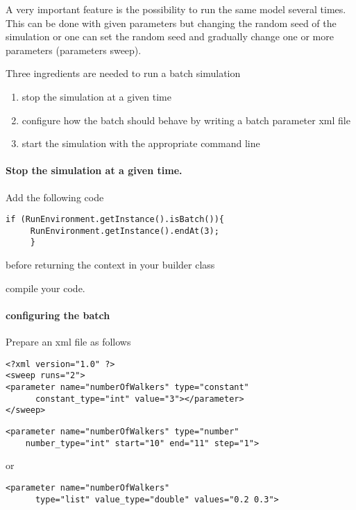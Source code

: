 \documentclass{article}
\begin{document}
A very important feature is the possibility to run the same model several times. This can be done with given parameters but changing the random seed of the simulation or one can set the random seed and gradually change one or more parameters (parameters sweep).

Three ingredients are needed to run a batch simulation
\begin{enumerate}
	\item stop the simulation at a given time
	\item configure how the batch should behave by writing a batch parameter xml file
	\item start the simulation with the appropriate command line
\end{enumerate}

\paragraph{Stop the simulation at a given time.}

Add the following code 
\begin{verbatim}
if (RunEnvironment.getInstance().isBatch()){
     RunEnvironment.getInstance().endAt(3);
     }
\end{verbatim}
before returning the context in your builder class

compile your code.

\paragraph{configuring the batch}

Prepare an xml file as follows

\begin{verbatim}
<?xml version="1.0" ?>
<sweep runs="2">
<parameter name="numberOfWalkers" type="constant" 
      constant_type="int" value="3"></parameter>
</sweep>
\end{verbatim}

\begin{verbatim}
<parameter name="numberOfWalkers" type="number" 
    number_type="int" start="10" end="11" step="1">
\end{verbatim}

or

\begin{verbatim}
<parameter name="numberOfWalkers" 
      type="list" value_type="double" values="0.2 0.3">
\end{verbatim}
\end{document}

